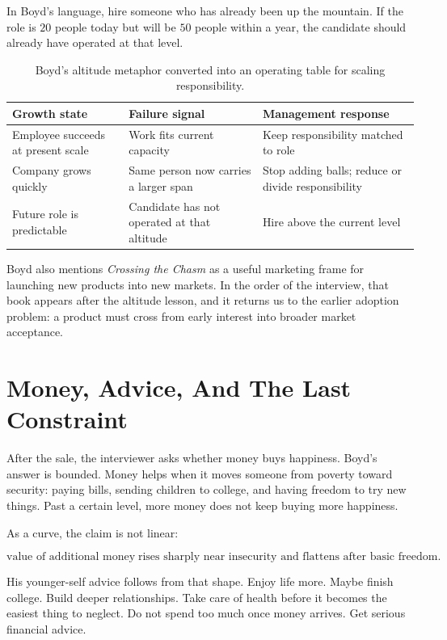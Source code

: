 In Boyd's language, hire someone who has already been up the mountain. If the role is \(20\) people today but will be \(50\) people within a year, the candidate should already have operated at that level.

\begin{table}
\centering
\small
\begin{tabular}{|p{.22\linewidth}|p{.28\linewidth}|p{.34\linewidth}|}
\hline
\textbf{Growth state} & \textbf{Failure signal} & \textbf{Management response} \\
\hline
Employee succeeds at present scale & Work fits current capacity & Keep responsibility matched to role \\
\hline
Company grows quickly & Same person now carries a larger span & Stop adding balls; reduce or divide responsibility \\
\hline
Future role is predictable & Candidate has not operated at that altitude & Hire above the current level \\
\hline
\end{tabular}
\caption{Boyd's altitude metaphor converted into an operating table for scaling responsibility.}
\end{table}

Boyd also mentions \emph{Crossing the Chasm} as a useful marketing frame for launching new products into new markets. In the order of the interview, that book appears after the altitude lesson, and it returns us to the earlier adoption problem: a product must cross from early interest into broader market acceptance.

\section{Money, Advice, And The Last Constraint}

After the sale, the interviewer asks whether money buys happiness. Boyd's answer is bounded. Money helps when it moves someone from poverty toward security: paying bills, sending children to college, and having freedom to try new things. Past a certain level, more money does not keep buying more happiness.

As a curve, the claim is not linear:

\begin{equation}
\text{value of additional money}
\;\text{rises sharply near insecurity and flattens after basic freedom}.
\end{equation}

His younger-self advice follows from that shape. Enjoy life more. Maybe finish college. Build deeper relationships. Take care of health before it becomes the easiest thing to neglect. Do not spend too much once money arrives. Get serious financial advice.

